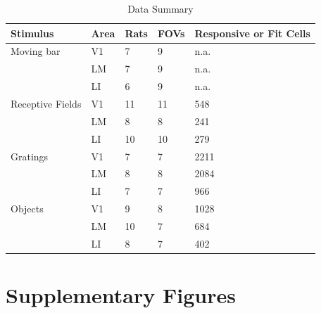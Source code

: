 \clearpage


\begin{table}[h]
  \caption{Data Summary}
  \centering
  \begin{tabular}{lllll}
    \toprule
    Stimulus & Area & Rats & FOVs & Responsive or Fit Cells   \\
    \midrule
    Moving bar & V1  & 7 & 9 & n.a.        \\
               & LM  & 7 & 9 & n.a.         \\
               & LI  & 6 & 9 & n.a.          \\
    \midrule
    Receptive Fields & V1  & 11 & 11 & 548  \\
                     & LM  & 8 & 8 & 241   \\
                     & LI  & 10 & 10 & 279    \\
    \midrule
    Gratings & V1  & 7 & 7 & 2211     \\
             & LM  & 8 & 8 & 2084     \\
             & LI  & 7 & 7 & 966     \\
    \midrule
    Objects  & V1  & 9 & 8 & 1028   \\
             & LM  & 10 & 7 & 684   \\
             & LI  & 8 & 7 & 402    \\
    \bottomrule
  \end{tabular}
  \label{tab:data_counts}
\end{table}

\clearpage

\section{Supplementary Figures}

